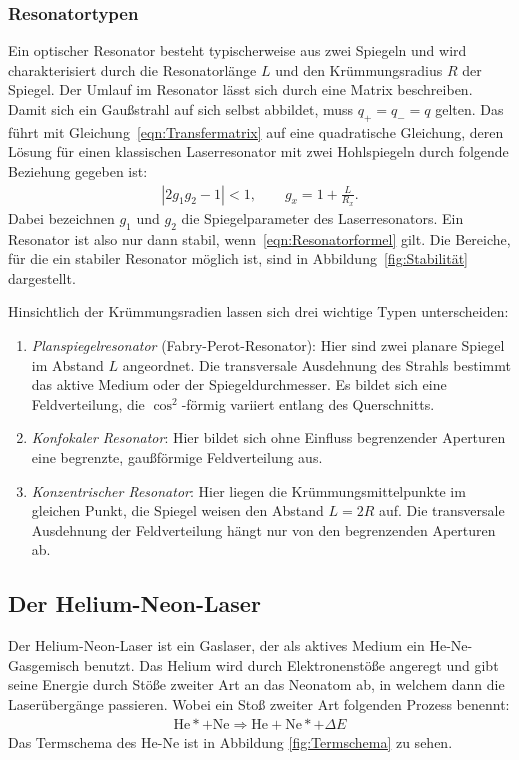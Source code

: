 \documentclass[a4paper,twoside,final]{article}
\begin{document}
\subsubsection{Resonatortypen}
Ein optischer Resonator besteht typischerweise aus zwei Spiegeln und wird charakterisiert durch die Resonatorlänge $L$ und den Krümmungsradius $R$ der Spiegel. Der Umlauf im Resonator lässt sich durch eine Matrix beschreiben. Damit sich ein Gaußstrahl auf sich selbst abbildet, muss $q_+ = q_- = q$ gelten. Das führt mit Gleichung~\eqref{eqn:Transfermatrix} auf eine quadratische Gleichung, deren Lösung für einen klassischen Laserresonator mit zwei Hohlspiegeln durch folgende Beziehung gegeben ist:
\begin{align}\label{eqn:Resonatorformel}
  |2g_1 g_2 -1 | < 1, \qquad g_x = 1 + \frac{L}{R_x}.
\end{align}
Dabei bezeichnen $g_1$ und $g_2$ die Spiegelparameter des Laserresonators. Ein Resonator ist also nur dann stabil, wenn~\eqref{eqn:Resonatorformel} gilt. Die Bereiche, für die ein stabiler Resonator möglich ist, sind in Abbildung~\ref{fig:Stabilität} dargestellt.



Hinsichtlich der Krümmungsradien lassen sich drei wichtige Typen unterscheiden:

\begin{enumerate}[label=\Alph*)]
  \item \emph{Planspiegelresonator} (Fabry-Perot-Resonator): Hier sind zwei planare Spiegel im Abstand $L$ angeordnet. Die transversale Ausdehnung des Strahls bestimmt das aktive Medium oder der Spiegeldurchmesser. Es bildet sich eine Feldverteilung, die $\cos^2$-förmig variiert entlang des Querschnitts.
  \item \emph{Konfokaler Resonator}: Hier bildet sich ohne Einfluss begrenzender Aperturen eine begrenzte, gaußförmige Feldverteilung aus.
  \item \emph{Konzentrischer Resonator}: Hier liegen die Krümmungsmittelpunkte im gleichen Punkt, die Spiegel weisen den Abstand $L=2R$ auf. Die transversale Ausdehnung der Feldverteilung hängt nur von den begrenzenden Aperturen ab.
\end{enumerate}
\FloatBarrier
\subsection{Der Helium-Neon-Laser}
Der Helium-Neon-Laser ist ein Gaslaser, der als aktives Medium ein He-Ne-Gasgemisch benutzt. Das Helium wird durch Elektronenstöße angeregt und gibt seine Energie durch Stöße zweiter Art an das Neonatom ab, in welchem dann die Laserübergänge passieren. Wobei ein Stoß zweiter Art folgenden Prozess benennt:
\begin{align}
  \text{He}* + \text{Ne} \Rightarrow \text{He}+\text{Ne}*+\Delta E
\end{align}
Das Termschema des He-Ne ist in Abbildung \ref{fig:Termschema} zu sehen.
\end{document}
